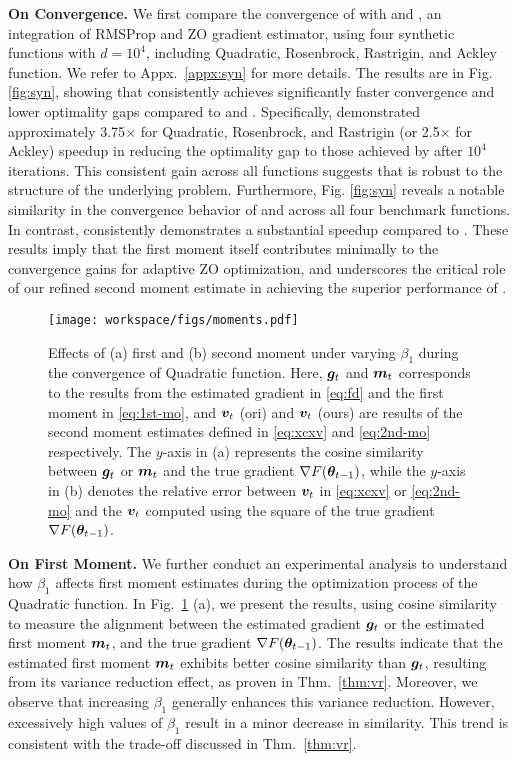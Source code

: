 \textbf{On Convergence.} We first compare the convergence of \ours{} with \base{} and \rms{}, an integration of RMSProp \citep{rmsprop} and ZO gradient estimator, using four synthetic functions with $d{=}10^4$, including Quadratic, Rosenbrock, Rastrigin, and Ackley function. We refer to Appx.~\ref{appx:syn} for more details. The results are in Fig. \ref{fig:syn}, showing that \ours{} consistently achieves significantly faster convergence and lower optimality gaps compared to \rms{} and \base{}. Specifically, \ours{} demonstrated approximately 3.75$\times$ for Quadratic, Rosenbrock, and Rastrigin (or 2.5$\times$ for Ackley) speedup in reducing the optimality gap to those achieved by \rms{} after $10^4$ iterations. This consistent gain across all functions suggests that \ours{} is robust to the structure of the underlying problem. Furthermore, Fig. \ref{fig:syn} reveals a notable similarity in the convergence behavior of \base{} and \rms{} across all four benchmark functions. In contrast, \ours{} consistently demonstrates a substantial speedup compared to \rms{}. These results imply that the first moment itself contributes minimally to the convergence gains for adaptive ZO optimization, and underscores the critical role of our refined second moment estimate in achieving the superior performance of \ours{}.

\begin{figure}[t]
\vspace{-2mm}
\centering
\texttt{[image: workspace/figs/moments.pdf]}
\caption{Effects of (a) first and (b) second moment under varying $\beta_1$ during the convergence of Quadratic function. Here, ${\bm{g}}_t$ and ${\bm{m}}_t$ corresponds to the results from the estimated gradient in \eqref{eq:fd} and the first moment in \eqref{eq:1st-mo}, and ${\bm{v}}_t$ (ori) and ${\bm{v}}_t$ (ours) are results of the second moment estimates defined in \eqref{eq:xcxv} and \eqref{eq:2nd-mo} respectively. The $y$-axis in (a) represents the cosine similarity between ${\bm{g}}_t$ or ${\bm{m}}_t$ and the true gradient $\nabla F({\bm{\theta}}_{t-1})$, while the $y$-axis in (b) denotes the relative error between ${\bm{v}}_t$ in \eqref{eq:xcxv} or \eqref{eq:2nd-mo} and the ${\bm{v}}_t$ computed using the square of the true gradient $\nabla F({\bm{\theta}}_{t-1})$.}
\label{fig:moments}
\end{figure}

\textbf{On First Moment.} 
We further conduct an experimental analysis to understand how $\beta_1$ affects first moment estimates during the optimization process of the Quadratic function. In Fig.~\ref{fig:moments} (a), we present the results, using cosine similarity to measure the alignment between the estimated gradient ${\bm{g}}_t$ or the estimated first moment ${\bm{m}}_t$, and the true gradient $\nabla F({\bm{\theta}}_{t-1})$. The results indicate that the estimated first moment ${\bm{m}}_t$ exhibits better cosine similarity than ${\bm{g}}_t$, resulting from its variance reduction effect, as proven in Thm.~\ref{thm:vr}.  Moreover, we observe that increasing $\beta_1$ generally enhances this variance reduction. However, excessively high values of $\beta_1$ result in a minor decrease in similarity. This trend is consistent with the trade-off discussed in Thm.~\ref{thm:vr}.

